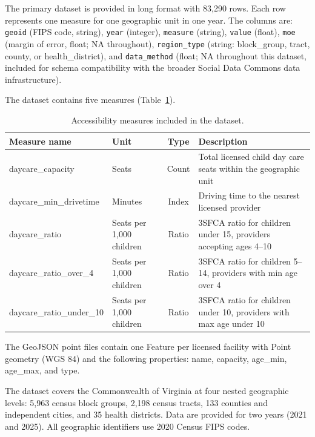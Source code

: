 \documentclass{CUP-JNL-DAP}%
\begin{document}
The primary dataset is provided in long format with 83{,}290 rows. Each row represents one measure for one geographic unit in one year. The columns are: \texttt{geoid} (FIPS code, string), \texttt{year} (integer), \texttt{measure} (string), \texttt{value} (float), \texttt{moe} (margin of error, float; NA throughout), \texttt{region\_type} (string: block\_group, tract, county, or health\_district), and \texttt{data\_method} (float; NA throughout this dataset, included for schema compatibility with the broader Social Data Commons data infrastructure).

The dataset contains five measures (Table~\ref{tab:measures}).

\begin{table}[ht]
\centering
\caption{Accessibility measures included in the dataset.}
\label{tab:measures}
\small
\begin{tabularx}{\textwidth}{llcX}
\toprule
Measure name & Unit & Type & Description \\
\midrule
daycare\_capacity & Seats & Count & Total licensed child day care seats within the geographic unit \\
daycare\_min\_drivetime & Minutes & Index & Driving time to the nearest licensed provider \\
daycare\_ratio & Seats per 1{,}000 children & Ratio & 3SFCA ratio for children under 15, providers accepting ages 4--10 \\
daycare\_ratio\_over\_4 & Seats per 1{,}000 children & Ratio & 3SFCA ratio for children 5--14, providers with min age over 4 \\
daycare\_ratio\_under\_10 & Seats per 1{,}000 children & Ratio & 3SFCA ratio for children under 10, providers with max age under 10 \\
\bottomrule
\end{tabularx}
\end{table}

The GeoJSON point files contain one Feature per licensed facility with Point geometry (WGS 84) and the following properties: name, capacity, age\_min, age\_max, and type.

The dataset covers the Commonwealth of Virginia at four nested geographic levels: 5{,}963 census block groups, 2{,}198 census tracts, 133 counties and independent cities, and 35 health districts. Data are provided for two years (2021 and 2025). All geographic identifiers use 2020 Census FIPS codes.

\end{document}
